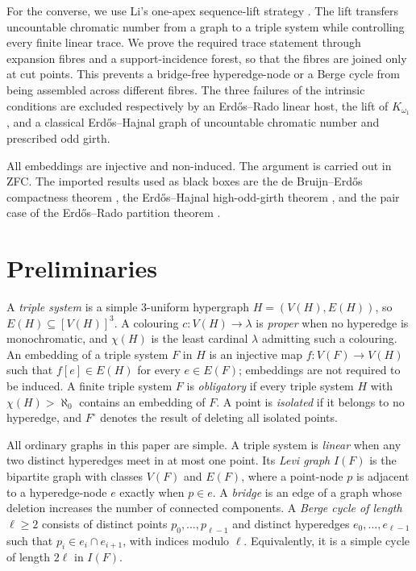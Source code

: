 \documentclass[a4paper,11pt,reqno]{amsart}
\theoremstyle{plain}
\theoremstyle{definition}
\theoremstyle{remark}
\begin{document}
For the converse, we use Li's one-apex sequence-lift strategy
\citep[Sections~3--4]{li2026}.  The lift transfers uncountable chromatic
number from a graph to a triple system while controlling every finite linear
trace.  We prove the required trace statement through expansion fibres and a
support-incidence forest, so that the fibres are joined only at cut points.
This prevents a bridge-free hyperedge-node or a Berge cycle from being
assembled across different fibres.  The three failures of the intrinsic
conditions are excluded respectively by an Erdős--Rado linear host, the lift
of $K_{\omega_1}$, and a classical Erdős--Hajnal graph of uncountable
chromatic number and prescribed odd girth.

All embeddings are injective and non-induced.  The argument is carried out
in ZFC.  The imported results used as black boxes are the de Bruijn--Erdős
compactness theorem \citep[Theorem~1, pp.~371--373]{debruijn1951}, the
Erdős--Hajnal high-odd-girth theorem
\citep[Theorem~7.4, p.~76]{erdoshajnal1966}, and the pair case of the
Erdős--Rado partition theorem
\citep[Theorem~4(i), formula~(95), p.~471]{erdosrado1956}.

\section{Preliminaries}\label{conventions-and-definitions}

A \emph{triple system} is a simple \(3\)-uniform hypergraph \(H=(V(H),E(H))\), so \(E(H)\subseteq[V(H)]^3\). A colouring \(c:V(H)\to\lambda\) is \emph{proper} when no hyperedge is monochromatic, and \(\chi(H)\) is the least cardinal \(\lambda\) admitting such a colouring. An embedding of a triple system \(F\) in \(H\) is an injective map \(f:V(F)\to V(H)\) such that \(f[e]\in E(H)\) for every \(e\in E(F)\); embeddings are not required to be induced. A finite triple system \(F\) is \emph{obligatory} if every triple system \(H\) with \(\chi(H)>\aleph_0\) contains an embedding of \(F\). A point is \emph{isolated} if it belongs to no hyperedge, and \(F^\circ\) denotes the result of deleting all isolated points.

All ordinary graphs in this paper are simple. A triple system is \emph{linear} when any two distinct hyperedges meet in at most one point. Its \emph{Levi graph} \(I(F)\) is the bipartite graph with classes \(V(F)\) and \(E(F)\), where a point-node \(p\) is adjacent to a hyperedge-node \(e\) exactly when \(p\in e\). A \emph{bridge} is an edge of a graph whose deletion increases the number of connected components. A \emph{Berge cycle of length} \(\ell\ge2\) consists of distinct points \(p_0,\ldots,p_{\ell-1}\) and distinct hyperedges \(e_0,\ldots,e_{\ell-1}\) such that \(p_i\in e_i\cap e_{i+1}\), with indices modulo \(\ell\). Equivalently, it is a simple cycle of length \(2\ell\) in \(I(F)\).
\end{document}
